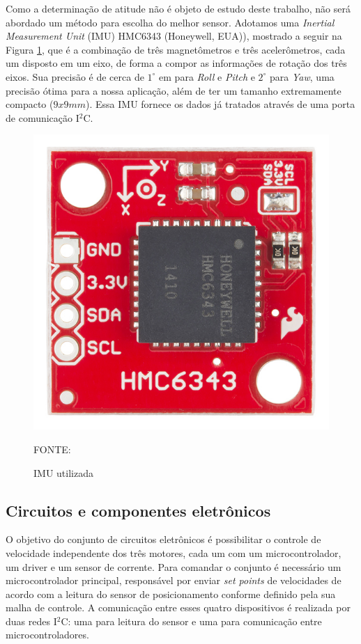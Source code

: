 \documentclass[
	12pt,				%
	openany,			%
	twoside,			%
	a4paper,			%
	english,			%
	french,				%
	spanish,			%
	brazil,				%
	oldfontcommands
	]{abntex2}
\begin{document}
Como a determinação de atitude não é objeto de estudo deste trabalho, não será abordado um método para escolha do melhor sensor. Adotamos uma \textit{Inertial Measurement Unit} (IMU) HMC6343 (Honeywell, EUA)), mostrado a seguir na Figura \ref{fig:IMU}, que é a combinação de três magnetômetros e três acelerômetros, cada um disposto em um eixo, de forma a compor as informações de rotação dos três eixos. Sua precisão é de cerca de $1^{\circ}$ em para \textit{Roll} e \textit{Pitch} e $2^{\circ}$ para \textit{Yaw}, uma precisão ótima para a nossa aplicação, além de ter um tamanho extremamente compacto ($9x9mm$). Essa IMU fornece os dados já tratados através de uma porta de comunicação I$^{2}$C.

\begin{figure}[th]
	\caption{IMU utilizada}
	\centering
	\includegraphics[width=0.6\linewidth]{./figs/IMU-HMC6343}
	
	\begin{small}
		FONTE: \cite{IMU}
	\end{small}
	\label{fig:IMU}
\end{figure}

\subsection{Circuitos e componentes eletrônicos}

O objetivo do conjunto de circuitos eletrônicos é possibilitar o controle de velocidade independente dos três motores, cada um com um microcontrolador, um driver e um sensor de corrente. Para comandar o conjunto é necessário um microcontrolador principal, responsável por enviar \textit{set points} de velocidades de acordo com a leitura do sensor de posicionamento conforme definido pela sua malha de controle. A comunicação entre esses quatro dispositivos é realizada por duas redes I$^{2}$C: uma para leitura do sensor e uma para comunicação entre microcontroladores.
\end{document}
